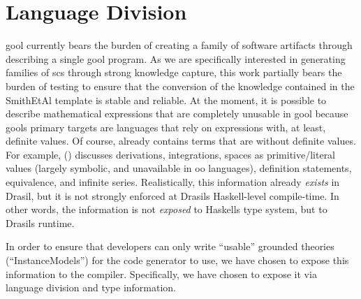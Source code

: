 \section{Language Division}

\acs{gool} currently bears the burden of creating a family of software artifacts
through describing a single \acs{gool} program. As we are specifically
interested in generating families of \acs{scs} through strong knowledge capture,
this work partially bears the burden of testing to ensure that the conversion of
the knowledge contained in the SmithEtAl template \cite{SmithAndLai2005} is
stable and reliable. At the moment, it is possible to describe mathematical
expressions that are completely unusable in \acs{gool} because \acsp{gool}
primary targets are languages that rely on expressions with, at least, definite
values. Of course, \Expr{} already contains terms that are without definite
values. For example, \Expr{} () discusses derivations,
integrations, spaces as primitive/literal values (largely symbolic, and
unavailable in \acs{oo} languages), definition statements, equivalence, and infinite series. Realistically, this information
already \textit{exists} in Drasil, but it is not strongly enforced at Drasils
Haskell-level compile-time. In other words, the information is not
\textit{exposed} to Haskells type system, but to Drasils runtime.

In order to ensure that developers can only write ``usable'' grounded theories
(``InstanceModels'') for the code generator to use, we have chosen to expose
this information to the compiler. Specifically, we have chosen to expose it via
language division and type information.

\languageDivision{}


